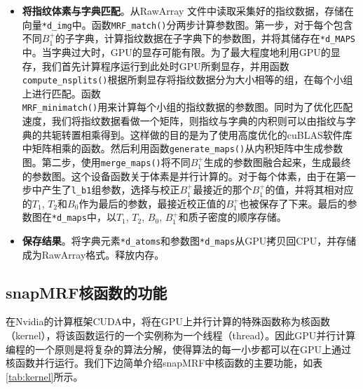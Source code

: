 \begin{itemize}
\item \textbf{将指纹体素与字典匹配}。从RawArray \cite{RawArray}文件中读取采集好的指纹数据，存储在向量\texttt{*d\_img}中。函数\texttt{MRF\_match()}分两步计算参数图。第一步，对于每个包含不同$B_1^+$的子字典，计算指纹数据在子字典下的参数图，并将其储存在\texttt{*d\_MAPS}中。当字典过大时，GPU的显存可能有限。为了最大程度地利用GPU的显存，我们首先计算程序运行到此处时GPU所剩显存，并用函数\texttt{compute\_nsplits()}根据所剩显存将指纹数据分为大小相等的组，在每个小组上进行匹配。函数\\ \texttt{MRF\_minimatch()}用来计算每个小组的指纹数据的参数图。同时为了优化匹配速度，我们将指纹数据看做一个矩阵，则指纹与字典的内积则可以由指纹与字典的共轭转置相乘得到。这样做的目的是为了使用高度优化的cuBLAS软件库中矩阵相乘的函数。然后利用函数\texttt{generate\_maps()}从内积矩阵中生成参数图。第二步，使用\texttt{merge\_maps()}将不同$B_1^+$生成的参数图融合起来，生成最终的参数图。这个设备函数关于体素是并行计算的。对于每个体素，由于在第一步中产生了\texttt{l\_b1}组参数，选择与校正$B_1^+$最接近的那个$B_1^+$的值，并将其相对应的$T_1$, $T_2$和$B_0$作为最后的参数，最接近校正值的$B_1^+$也被保存了下来。最后的参数图在\texttt{*d\_maps}中，以$T_1$, $T_2$, $B_0$, $B_1^+$和质子密度的顺序存储。

\item \textbf{保存结果}。将字典元素\texttt{*d\_atoms}和参数图\texttt{*d\_maps}从GPU拷贝回CPU，并存储成为RawArray格式。释放内存。

\end{itemize}

\subsection{snapMRF核函数的功能}
在Nvidia的计算框架CUDA中，将在GPU上并行计算的特殊函数称为核函数（kernel），将该函数运行的一个实例称为一个线程（thread）。因此GPU并行计算编程的一个原则是将复杂的算法分解，使得算法的每一小步都可以在GPU上通过核函数并行运行。我们下边简单介绍snapMRF中核函数的主要功能，如表\ref{tab:kernel}所示。

